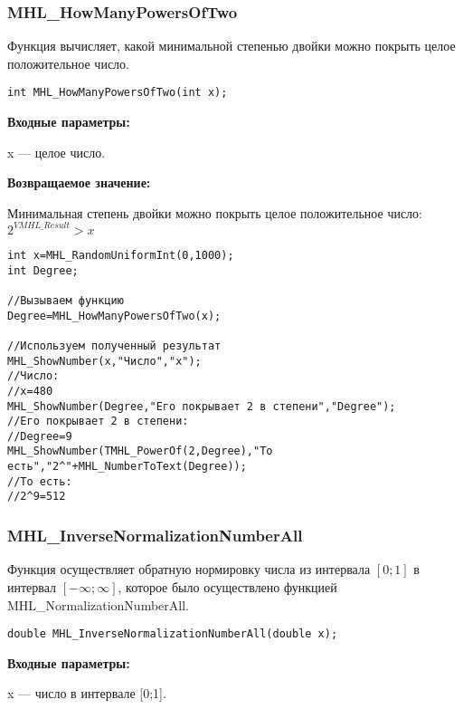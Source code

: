 \documentclass[a4paper,12pt]{article}
\begin{document}
\subsubsection{MHL\_HowManyPowersOfTwo}\label{MHL_HowManyPowersOfTwo}

Функция вычисляет, какой минимальной степенью двойки можно покрыть целое положительное число.


\begin{lstlisting}[label=code_syntax_MHL_HowManyPowersOfTwo,caption=Синтаксис]
int MHL_HowManyPowersOfTwo(int x);
\end{lstlisting}

\textbf{Входные параметры:}  
 
x --- целое число.

\textbf{Возвращаемое значение:}
 
 Минимальная степень двойки можно покрыть целое положительное число: $2^{VMHL\_Result}>x$


\begin{lstlisting}[label=code_use_MHL_HowManyPowersOfTwo,caption=Пример использования]
int x=MHL_RandomUniformInt(0,1000);
int Degree;

//Вызываем функцию
Degree=MHL_HowManyPowersOfTwo(x);

//Используем полученный результат
MHL_ShowNumber(x,"Число","x");
//Число:
//x=480
MHL_ShowNumber(Degree,"Его покрывает 2 в степени","Degree");
//Его покрывает 2 в степени:
//Degree=9
MHL_ShowNumber(TMHL_PowerOf(2,Degree),"То есть","2^"+MHL_NumberToText(Degree));
//То есть:
//2^9=512
\end{lstlisting}

\subsubsection{MHL\_InverseNormalizationNumberAll}\label{MHL_InverseNormalizationNumberAll}

Функция осуществляет обратную нормировку числа из интервала $\left[0;1\right] $  в интервал $\left[-\infty;\infty \right] $, которое было осуществлено функцией MHL\_NormalizationNumberAll.


\begin{lstlisting}[label=code_syntax_MHL_InverseNormalizationNumberAll,caption=Синтаксис]
double MHL_InverseNormalizationNumberAll(double x);
\end{lstlisting}

\textbf{Входные параметры:}

 x --- число в интервале [0;1].
\end{document}
